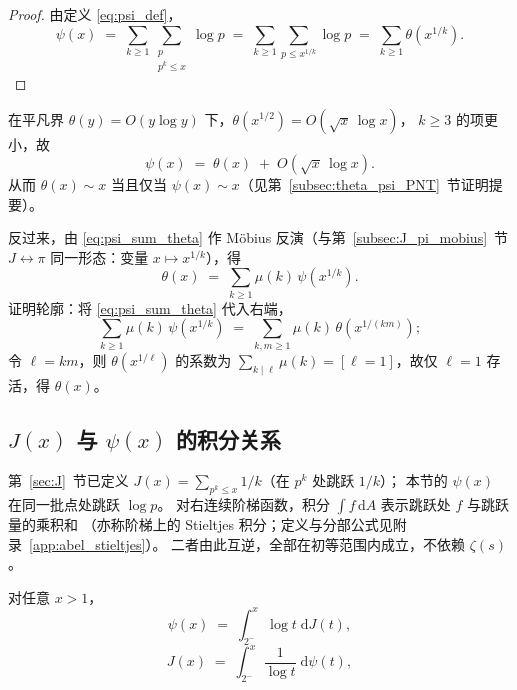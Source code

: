 \begin{proof}
由定义 \eqref{eq:psi_def}，
\[
\psi(x)
  \;=\;
  \sum_{k\ge 1}\sum_{\substack{p \\ p^k\le x}}\log p
  \;=\;
  \sum_{k\ge 1}\sum_{p\le x^{1/k}}\log p
  \;=\;
  \sum_{k\ge 1}\theta\!\left(x^{1/k}\right).
\]
\end{proof}

在平凡界 $\theta(y)=O(y\log y)$ 下，$\theta(x^{1/2})=O(\sqrt{x}\,\log x)$，
$k\ge 3$ 的项更小，故
\begin{equation}
  \psi(x)
  \;=\;
  \theta(x)
  \;+\;
  O\!\left(\sqrt{x}\,\log x\right).
\label{eq:psi_theta_asymp}
\end{equation}
从而 $\theta(x)\sim x$ 当且仅当 $\psi(x)\sim x$（见第~\ref{subsec:theta_psi_PNT}~节证明提要）。

反过来，由 \eqref{eq:psi_sum_theta} 作 Möbius 反演（与第~\ref{subsec:J_pi_mobius}~节
$J\leftrightarrow\pi$ 同一形态：变量 $x\mapsto x^{1/k}$），得
\begin{equation}
  \theta(x)
  \;=\;
  \sum_{k\ge 1}\mu(k)\,\psi\!\left(x^{1/k}\right).
\label{eq:theta_from_psi}
\end{equation}
证明轮廓：将 \eqref{eq:psi_sum_theta} 代入右端，
\[
\sum_{k\ge 1}\mu(k)\,\psi\!\left(x^{1/k}\right)
  \;=\;
  \sum_{k,m\ge 1}\mu(k)\,\theta\!\left(x^{1/(km)}\right);
\]
令 $\ell=km$，则 $\theta(x^{1/\ell})$ 的系数为
$\sum_{k\mid\ell}\mu(k)=[\ell=1]$，故仅 $\ell=1$ 存活，得 $\theta(x)$。

\subsection{\texorpdfstring{$J(x)$}{J(x)} 与 \texorpdfstring{$\psi(x)$}{psi(x)} 的积分关系}\label{subsec:J_psi_stieltjes}

第~\ref{sec:J}~节已定义 $J(x)=\sum_{p^k\le x}1/k$（在 $p^k$ 处跳跃 $1/k$）；
本节的 $\psi(x)$ 在同一批点处跳跃 $\log p$。
对右连续阶梯函数，积分 $\int f\,\mathrm{d}A$ 表示跳跃处 $f$ 与跳跃量的乘积和
（亦称阶梯上的 Stieltjes 积分；定义与分部公式见附录~\ref{app:abel_stieltjes}）。
二者由此互逆，全部在初等范围内成立，不依赖 $\zeta(s)$。

\begin{theorem}{}{}
对任意 $x > 1$，
\begin{equation}
\psi(x) \;=\; \int_{2^-}^{x} \log t \; \mathrm{d}J(t),
\label{eq:psi_from_J_stieltjes}
\end{equation}
\begin{equation}
J(x) \;=\; \int_{2^-}^{x} \frac{1}{\log t} \; \mathrm{d}\psi(t),
\label{eq:J_from_psi_stieltjes}
\end{equation}
\end{theorem}

